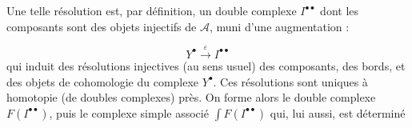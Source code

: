 Une telle résolution est, par définition, un double complexe
$I^{\bullet\bullet}$ dont les composants sont des objets injectifs de
$\mathcal A$, muni d'une augmentation :

\[
Y^{\bullet}\xrightarrow{\varepsilon}I^{\bullet\bullet}
\]
qui induit des résolutions injectives (au sens usuel) des composants, des
bords, et des objets de cohomologie du complexe $Y^{\bullet}$. Ces résolutions
sont uniques à homotopie (de doubles complexes) près. On forme alors le double
complexe $F(I^{\bullet\bullet})$, puis le complexe simple associé
$\int F(I^{\bullet\bullet})$ qui, lui aussi, est déterminé
